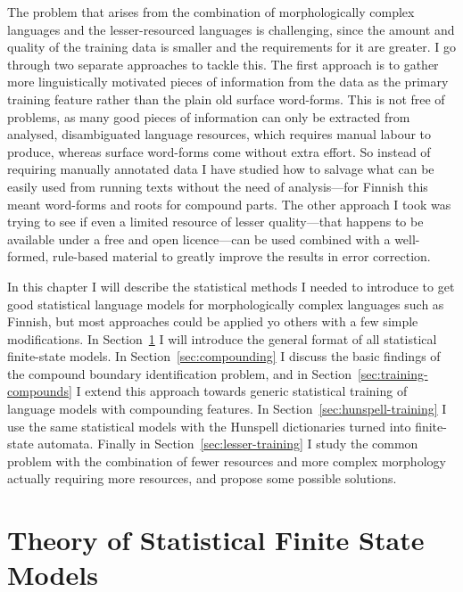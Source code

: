 \documentclass[officiallayout]{unihelcompling}
\begin{document}
The problem that arises from the combination of morphologically complex
languages and the lesser-resourced languages is challenging, since the amount
and quality of the training data is smaller and the requirements for it are
greater. I go through two separate approaches to tackle this. The first
approach is to gather more linguistically motivated pieces of information from
the data as the primary training feature rather than the plain old surface
word-forms. This is not free of problems, as many good pieces of information
can only be extracted from analysed, disambiguated language resources,
which requires manual labour to produce, whereas surface word-forms
come without extra effort. So instead of requiring manually annotated data I
have studied how to salvage what can be easily used from running texts without
the need of analysis---for Finnish this meant word-forms and roots for compound
parts. The other approach I took was trying to see if even a limited
resource of lesser quality---that happens to be available under a free and open
licence---can be used combined with a well-formed, rule-based material to
greatly improve the results in error correction.

In this chapter I will describe the statistical methods I needed to introduce
to get good statistical language models for morphologically complex languages
such as Finnish, but most approaches could be applied yo others with a
few simple modifications. In Section~\ref{sec:statistical} I will introduce the
general format of all statistical finite-state models.  In
Section~\ref{sec:compounding} I discuss the basic findings of the compound boundary
identification problem, and in Section~\ref{sec:training-compounds} I extend
this approach towards generic statistical training of language models with
compounding features. In Section~\ref{sec:hunspell-training} I use the same
statistical models with the Hunspell dictionaries turned into finite-state
automata. Finally in Section~\ref{sec:lesser-training} I study the common
problem with the combination of fewer resources and more complex morphology
actually requiring more resources, and propose some possible solutions.

\section{Theory of Statistical Finite State Models}
\label{sec:statistical}
\end{document}
